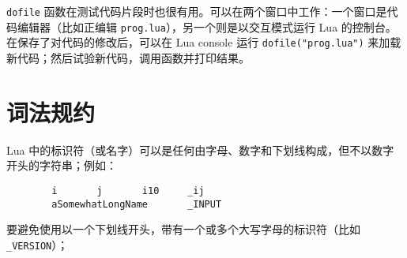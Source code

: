 \verb|dofile| 函数在测试代码片段时也很有用。可以在两个窗口中工作：一个窗口是代码编辑器（比如正编辑 \verb|prog.lua|），另一个则是以交互模式运行 Lua 的控制台。在保存了对代码的修改后，可以在 Lua console 运行 \verb|dofile("prog.lua")| 来加载新代码；然后试验新代码，调用函数并打印结果。

\section{词法规约}

Lua 中的标识符（或名字）可以是任何由字母、数字和下划线构成，但不以数字开头的字符串；例如：

\begin{verbatim}
        i       j       i10     _ij
        aSomewhatLongName       _INPUT
\end{verbatim}

要避免使用以一个下划线开头，带有一个或多个大写字母的标识符（比如 \verb|_VERSION|）；